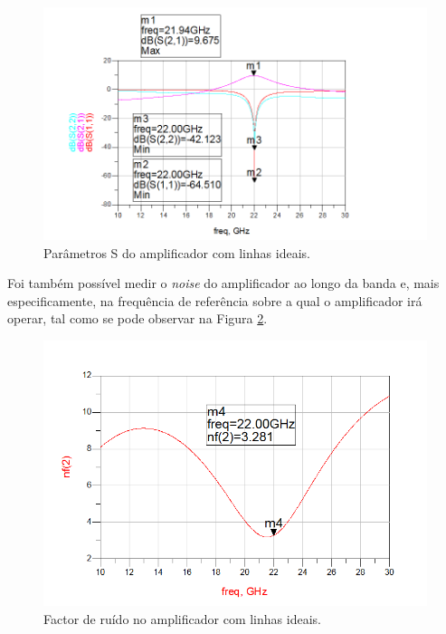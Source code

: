 \documentclass[11pt]{article}
\numberwithin{equation}{section}
\begin{document}
\begin{figure}[H]
	\centering
	\includegraphics[keepaspectratio=true, scale=0.45]{exps/Ideal_S}
	\vspace{-0.5em}
	\caption{Parâmetros S do amplificador com linhas ideais.}
	\vspace{-0.8em}
	\label{fig:ideal_S}
\end{figure}

Foi também possível medir o \textit{noise} do amplificador ao longo da banda e, mais especificamente, na frequência de referência sobre a qual o amplificador irá operar, tal como se pode observar na Figura \ref{fig:ideal_noise}.

\begin{figure}[H]
	\centering
	\includegraphics[keepaspectratio=true, scale=0.45]{exps/Ideal_noise}
	\vspace{-0.5em}
	\caption{Factor de ruído no amplificador com linhas ideais.}
	\vspace{-0.8em}
	\label{fig:ideal_noise}
\end{figure}
\end{document}
